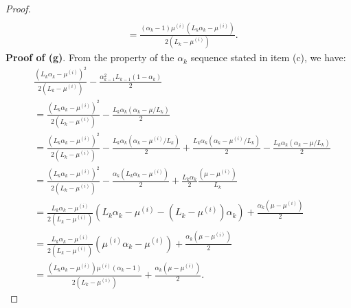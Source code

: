 \documentclass[12pt]{article}
\begin{document}
\begin{proof}
{\begin{align*}
                \\
                &= \frac{(\alpha_k - 1)\mu^{(i)}\left(L_k\alpha_k - \mu^{(i)}\right)}
                {2\left(L_k - \mu^{(i)}\right)}. 
            \end{align*}
            }
            \textbf{Proof of (g)}.
            From the property of the $\alpha_k$ sequence stated in item (c), we have: 
            \begin{align*}
                &\frac{\left(
                    L_k\alpha_k - \mu^{(i)}
                \right)^2}{2(L_k - \mu^{(i)})} 
                -
                \frac{\alpha_{k - 1}^2L_{k - 1}(1 - \alpha_k)}{2} 
                \\
                &= 
                \frac{\left(
                    L_k\alpha_k - \mu^{(i)}
                \right)^2}{2(L_k - \mu^{(i)})} 
                -
                \frac{L_k\alpha_k(\alpha_k - \mu/L_k)}{2} 
                \\
                &=
                \frac{\left(
                    L_k\alpha_k - \mu^{(i)}
                \right)^2}{2(L_k - \mu^{(i)})} 
                - \frac{L_k\alpha_k(\alpha_k - \mu^{(i)}/L_k)}{2}
                + \frac{L_k\alpha_k(\alpha_k - \mu^{(i)}/L_k)}{2} 
                - \frac{L_k\alpha_k(\alpha_k - \mu/L_k)}{2} 
                \\
                &= 
                \frac{\left(
                    L_k\alpha_k - \mu^{(i)}
                \right)^2}{2(L_k - \mu^{(i)})} 
                - \frac{\alpha_k\left(L_k\alpha_k - \mu^{(i)}\right)}{2}
                + \frac{L_k\alpha_k}{2}
                \frac{\left(
                    \mu - \mu^{(i)}
                \right)}{L_k}
                \\
                &=
                \frac{L_k \alpha_k - \mu^{(i)}}{2(L_k - \mu^{(i)})}\left(
                    L_k \alpha_k - \mu^{(i)} 
                    - \left(L_k - \mu^{(i)}\right)\alpha_k
                \right)
                + \frac{\alpha_k(\mu - \mu^{(i)})}{2}
                \\
                &= \frac{L_k \alpha_k - \mu^{(i)}}{2(L_k - \mu^{(i)})}\left(
                    \mu^{(i)}\alpha_k - \mu^{(i)} 
                \right)
                + \frac{\alpha_k(\mu - \mu^{(i)})}{2}
                \\
                &= 
                \frac{
                    \left(L_k \alpha_k - \mu^{(i)}\right)\mu^{(i)}
                    \left(\alpha_k - 1\right)
                }
                {2(L_k - \mu^{(i)})}
                + \frac{\alpha_k(\mu - \mu^{(i)})}{2}. 
            \end{align*}
        \end{proof}
\end{document}

